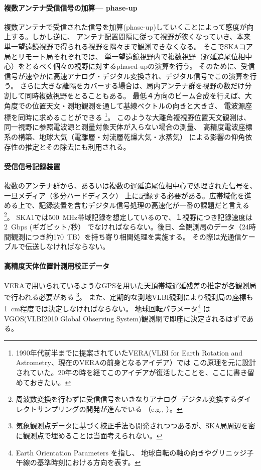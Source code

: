 \paragraph{複数アンテナ受信信号の加算--- phase-up}
複数アンテナで受信された信号を加算(phase-up)していくことによって感度が向上する。しかし逆に、
アンテナ配置間隔に従って視野が狭くなっていき、本来単一望遠鏡視野で得られる視野を隅々まで観測できなくなる。
そこでSKAコア局とリモート局それぞれでは、
単一望遠鏡視野内で複数視野（遅延追尾位相中心）をとるべく個々の視野に対するphased-upの演算を行う。
そのために、受信信号が速やかに高速アナログ・デジタル変換され、デジタル信号でこの演算を行う。
さらに大きな離隔をカバーする場合は、局内アンテナ群を視野の数だけ分割して同時複数視野をとることもある。
最低４方向のビーム合成を行えば、大角度での位置天文・測地観測を通して基線ベクトルの向きと大きさ、
電波源座標を同時に求めることができる
\footnote
{1990年代前半までに提案されていたVERA(VLBI for Earth Rotation and Astrometry、現在のVERAの前身となるアイデア）では
この原理を元に設計されていた。20年の時を経てこのアイデアが復活したことを、ここに書き留めておきたい。}。
このような大離角複視野位置天文観測は、同一視野に参照電波源と測量対象天体が入らない場合の測量、
高精度電波座標系の構築、地球大気（電離層・対流層乾燥大気・水蒸気）
による影響の仰角依存性の推定とその除去にも利用される。

\paragraph{受信信号記録装置}
複数のアンテナ群から、あるいは複数の遅延追尾位相中心で処理された信号を、一旦メディア（多分ハードディスク）
上に記録する必要がある。広帯域化を進める上で、記録装置を含むデジタル信号処理の高速化が一番の課題だと言える
\footnote{周波数変換を行わずに受信信号をいきなりアナログ--デジタル変換するダイレクトサンプリングの開発が進んでいる
（e.g., \citealt{2012ivs..conf...91O}）。}。
SKA1では500~MHz帯域記録を想定しているので、１視野につき記録速度は2~Gbps (ギガビット/秒）
でなければならない。後日、全観測局のデータ（24時間観測につき約170~TB）を持ち寄り相関処理を実施する。
その際は光通信ケーブルで伝送しなければならない。

\paragraph{高精度天体位置計測用校正データ}
VERAで用いられているようなGPSを用いた天頂帯域遅延残差の推定が各観測局で行われる必要がある
\footnote
{気象観測点データに基づく校正手法も開発されつつあるが、SKA局周辺を密に観測点で埋めることは当面考えられない。}。
また、定期的な測地VLBI観測により観測局の座標も1~cm程度では決定しなければならない。
地球回転パラメータ\footnote{Earth Orientation Parameters を指し、
地球自転の軸の向きやグリニッジ子午線の基準時刻における方向を表す。}
はVGOS(VLBI2010 Global Observing System)観測網で即座に決定されるはずである。
\\


